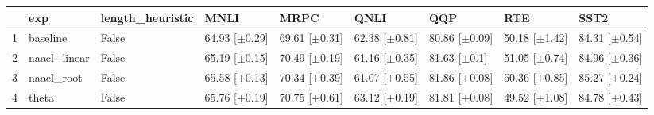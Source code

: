 \begin{table}[ht]
\centering
\begin{tabular}{rllllllll}
  \hline
 & exp & length_heuristic & MNLI & MRPC & QNLI & QQP & RTE & SST2 \\ 
  \hline
1 & baseline & False & 64.93 [$\pm$0.29] & 69.61 [$\pm$0.31] & 62.38 [$\pm$0.81] & 80.86 [$\pm$0.09] & 50.18 [$\pm$1.42] & 84.31 [$\pm$0.54] \\ 
  2 & naacl_linear & False & 65.19 [$\pm$0.15] & 70.49 [$\pm$0.19] & 61.16 [$\pm$0.35] & 81.63 [$\pm$0.1] & 51.05 [$\pm$0.74] & 84.96 [$\pm$0.36] \\ 
  3 & naacl_root & False & 65.58 [$\pm$0.13] & 70.34 [$\pm$0.39] & 61.07 [$\pm$0.55] & 81.86 [$\pm$0.08] & 50.36 [$\pm$0.85] & 85.27 [$\pm$0.24] \\ 
  4 & theta & False & 65.76 [$\pm$0.19] & 70.75 [$\pm$0.61] & 63.12 [$\pm$0.19] & 81.81 [$\pm$0.08] & 49.52 [$\pm$1.08] & 84.78 [$\pm$0.43] \\ 
   \hline
\end{tabular}
\end{table}
